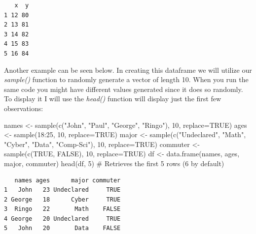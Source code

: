 \documentclass[
  letterpaper,
  DIV=11,
  numbers=noendperiod]{scrreprt}
\newenvironment{Shaded}{\begin{snugshade}}{\end{snugshade}}
\newcommand{\AttributeTok}[1]{\textcolor[rgb]{0.40,0.45,0.13}{#1}}
\newcommand{\CommentTok}[1]{\textcolor[rgb]{0.37,0.37,0.37}{#1}}
\newcommand{\ConstantTok}[1]{\textcolor[rgb]{0.56,0.35,0.01}{#1}}
\newcommand{\DecValTok}[1]{\textcolor[rgb]{0.68,0.00,0.00}{#1}}
\newcommand{\FunctionTok}[1]{\textcolor[rgb]{0.28,0.35,0.67}{#1}}
\newcommand{\NormalTok}[1]{\textcolor[rgb]{0.00,0.23,0.31}{#1}}
\newcommand{\OtherTok}[1]{\textcolor[rgb]{0.00,0.23,0.31}{#1}}
\newcommand{\SpecialCharTok}[1]{\textcolor[rgb]{0.37,0.37,0.37}{#1}}
\newcommand{\StringTok}[1]{\textcolor[rgb]{0.13,0.47,0.30}{#1}}
\begin{document}
\begin{verbatim}
   x  y
1 12 80
2 13 81
3 14 82
4 15 83
5 16 84
\end{verbatim}

Another example can be seen below. In creating this dataframe we will
utilize our \emph{sample()} function to randomly generate a vector of
length 10. When you run the same code you might have different values
generated since it does so randomly. To display it I will use the
\emph{head()} function will display just the first few observations:

\begin{Shaded}
\begin{Highlighting}[]
\NormalTok{names }\OtherTok{\textless{}{-}} \FunctionTok{sample}\NormalTok{(}\FunctionTok{c}\NormalTok{(}\StringTok{"John"}\NormalTok{, }\StringTok{"Paul"}\NormalTok{, }\StringTok{"George"}\NormalTok{, }\StringTok{"Ringo"}\NormalTok{), }\DecValTok{10}\NormalTok{, }\AttributeTok{replace=}\ConstantTok{TRUE}\NormalTok{)}
\NormalTok{ages }\OtherTok{\textless{}{-}} \FunctionTok{sample}\NormalTok{(}\DecValTok{18}\SpecialCharTok{:}\DecValTok{25}\NormalTok{, }\DecValTok{10}\NormalTok{, }\AttributeTok{replace=}\ConstantTok{TRUE}\NormalTok{)}
\NormalTok{major }\OtherTok{\textless{}{-}} \FunctionTok{sample}\NormalTok{(}\FunctionTok{c}\NormalTok{(}\StringTok{"Undeclared"}\NormalTok{, }\StringTok{"Math"}\NormalTok{, }\StringTok{"Cyber"}\NormalTok{, }\StringTok{"Data"}\NormalTok{, }\StringTok{"Comp{-}Sci"}\NormalTok{), }\DecValTok{10}\NormalTok{, }\AttributeTok{replace=}\ConstantTok{TRUE}\NormalTok{)}
\NormalTok{commuter }\OtherTok{\textless{}{-}} \FunctionTok{sample}\NormalTok{(}\FunctionTok{c}\NormalTok{(}\ConstantTok{TRUE}\NormalTok{, }\ConstantTok{FALSE}\NormalTok{), }\DecValTok{10}\NormalTok{, }\AttributeTok{replace=}\ConstantTok{TRUE}\NormalTok{)}
\NormalTok{df }\OtherTok{\textless{}{-}} \FunctionTok{data.frame}\NormalTok{(names, ages, major, commuter)}
\FunctionTok{head}\NormalTok{(df, }\DecValTok{5}\NormalTok{) }\CommentTok{\# Retrieves the first 5 rows (6 by default)}
\end{Highlighting}
\end{Shaded}

\begin{verbatim}
   names ages      major commuter
1   John   23 Undeclared     TRUE
2 George   18      Cyber     TRUE
3  Ringo   22       Math    FALSE
4 George   20 Undeclared     TRUE
5   John   20       Data    FALSE
\end{verbatim}
\end{document}

